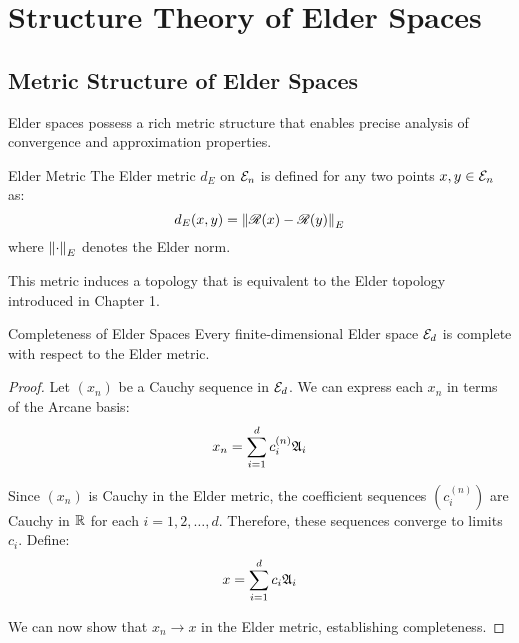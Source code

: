 
\chapter{Structure Theory of Elder Spaces}

\nochapterthumbnail

\section{Metric Structure of Elder Spaces}

\begin{twocolumnlayout}
Elder spaces possess a rich metric structure that enables precise analysis of convergence and approximation properties.

\begin{definition}{Elder Metric}{}
The Elder metric $d_E$ on $\mathcal{E}_{n}$ is defined for any two points $x, y \in \mathcal{E}_{n}$ as:
\begin{equation}
d_E(x, y) = \left\lVert\mathscr{R}(x) - \mathscr{R}(y)\right\rVert_E
\end{equation}
where $\left\lVert\cdot\right\rVert_E$ denotes the Elder norm.
\end{definition}

This metric induces a topology that is equivalent to the Elder topology introduced in Chapter 1.

\begin{theorem}{Completeness of Elder Spaces}{}
Every finite-dimensional Elder space $\mathcal{E}_{d}$ is complete with respect to the Elder metric.
\end{theorem}

\begin{proof}
Let $(x_n)$ be a Cauchy sequence in $\mathcal{E}_{d}$. We can express each $x_n$ in terms of the Arcane basis:
\begin{equation}
x_n = \sum_{i=1}^{d} c_i^{(n)} \mathfrak{A}_{i}
\end{equation}

Since $(x_n)$ is Cauchy in the Elder metric, the coefficient sequences $(c_i^{(n)})$ are Cauchy in $\mathbb{R}$ for each $i = 1, 2, \ldots, d$. Therefore, these sequences converge to limits $c_i$. Define:
\begin{equation}
x = \sum_{i=1}^{d} c_i \mathfrak{A}_{i}
\end{equation}

We can now show that $x_n \to x$ in the Elder metric, establishing completeness.
\end{proof}


\end{twocolumnlayout}
